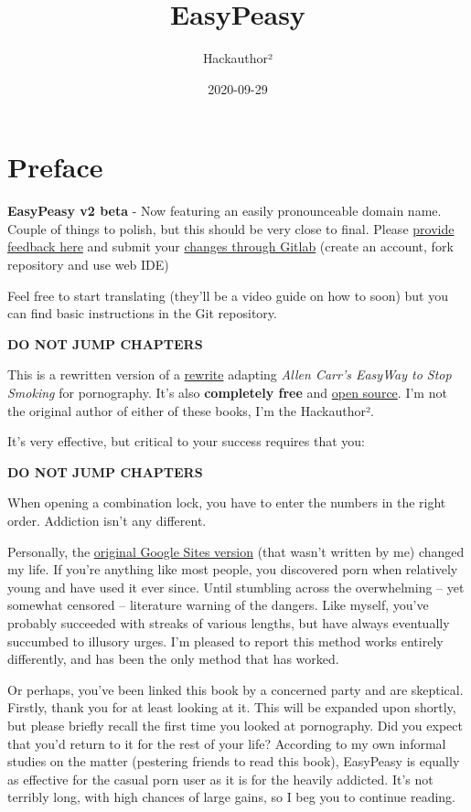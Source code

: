 \documentclass[
]{book}
\title{EasyPeasy}
\author{Hackauthor²}
\date{2020-09-29}
\begin{document}
\maketitle

{
\setcounter{tocdepth}{1}
\tableofcontents
}
\hypertarget{preface}{%
\chapter*{Preface}\label{preface}}

\textbf{EasyPeasy v2 beta} - Now featuring an easily pronounceable domain name. Couple of things to polish, but this should be very close to final. Please \href{https://boards.coomer.org/easy/res/1.html}{provide feedback here} and submit your \href{https://gitlab.com/snuggy/easypeasy/}{changes through Gitlab} (create an account, fork repository and use web IDE)

Feel free to start translating (they'll be a video guide on how to soon) but you can find basic instructions in the Git repository.

{\textbf{DO NOT JUMP CHAPTERS}}

This is a rewritten version of a \href{https://sites.google.com/site/hackbookeasypeasy}{rewrite} adapting \emph{Allen Carr's EasyWay to Stop Smoking} for pornography. It's also \textbf{completely free} and \href{https://gitlab.com/snuggy/easypeasy}{open source}. I'm not the original author of either of these books, I'm the Hackauthor².

It's very effective, but critical to your success requires that you:

{\textbf{DO NOT JUMP CHAPTERS}}

When opening a combination lock, you have to enter the numbers in the right order. Addiction isn't any different.

Personally, the \href{https://sites.google.com/site/hackbookeasypeasy}{original Google Sites version} (that wasn't written by me) changed my life. If you're anything like most people, you discovered porn when relatively young and have used it ever since. Until stumbling across the overwhelming -- yet somewhat censored -- literature warning of the dangers. Like myself, you've probably succeeded with streaks of various lengths, but have always eventually succumbed to illusory urges. I'm pleased to report this method works entirely differently, and has been the only method that has worked.

Or perhaps, you've been linked this book by a concerned party and are skeptical. Firstly, thank you for at least looking at it. This will be expanded upon shortly, but please briefly recall the first time you looked at pornography. Did you expect that you'd return to it for the rest of your life? According to my own informal studies on the matter (pestering friends to read this book), EasyPeasy is equally as effective for the casual porn user as it is for the heavily addicted. It's not terribly long, with high chances of large gains, so I beg you to continue reading.
\end{document}
